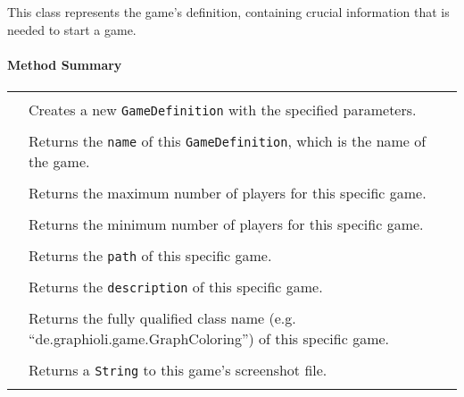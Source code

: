 \pagebreak

This class represents the game's definition, containing crucial information that is needed to start a game.

\centerdash
\paragraph*{Method Summary}
\paragraph*{}
\begin{longtable}{Lp{10cm}}
	\startmethodtable
	 \\
	& Creates a new \texttt{GameDefinition} with the specified parameters. \\
	 \\
	& Returns the \texttt{name} of this \texttt{GameDefinition}, which is the name of the game. \\
	 \\
	& Returns the maximum number of players for this specific game. \\
	 \\
	& Returns the minimum number of players for this specific game. \\
	 \\
	& Returns the \texttt{path} of this specific game. \\
	 \\
	& Returns the \texttt{description} of this specific game. \\
	 \\
	& Returns the fully qualified class name (e.g. ``de.graphioli.game.GraphColoring'') of this specific game. \\
	 \\
	& Returns a \texttt{String} to this game's screenshot file. \\
	 \\

\end{longtable}
